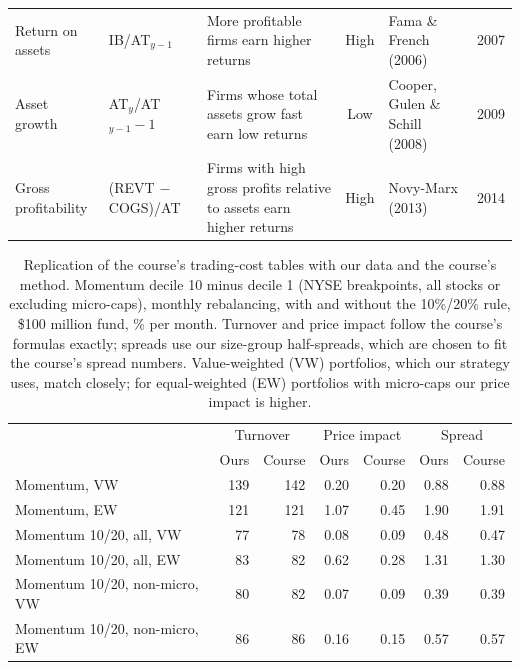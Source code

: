 \documentclass[12pt,a4paper]{article}
\begin{document}
\begin{singlespace}
\begin{table}[!htbp]
\begin{tabular}{L{2.2cm}L{3.9cm}L{4.4cm}cL{2.4cm}c}
Return on assets & IB/AT$_{y-1}$ & More profitable firms earn higher returns & High & Fama \& French (2006) & 2007\\
Asset growth & AT$_y$/AT$_{y-1}-1$ & Firms whose total assets grow fast earn low returns & Low & Cooper, Gulen \& Schill (2008) & 2009\\
Gross profitability & (REVT $-$ COGS)/AT & Firms with high gross profits relative to assets earn higher returns & High & Novy-Marx (2013) & 2014\\
\bottomrule\end{tabular}
\end{table}

\begin{table}[!htbp]\centering
\caption{Replication of the course's trading-cost tables with our data and the course's method. Momentum decile 10 minus decile 1 (NYSE breakpoints, all stocks or excluding micro-caps), monthly rebalancing, with and without the 10\%/20\% rule, \$100 million fund, \% per month. Turnover and price impact follow the course's formulas exactly; spreads use our size-group half-spreads, which are chosen to fit the course's spread numbers. Value-weighted (VW) portfolios, which our strategy uses, match closely; for equal-weighted (EW) portfolios with micro-caps our price impact is higher.}\label{tab:replication}
\footnotesize
\begin{tabular}{lrrrrrr}\toprule
 & \multicolumn{2}{c}{Turnover} & \multicolumn{2}{c}{Price impact} & \multicolumn{2}{c}{Spread}\\
 & Ours & Course & Ours & Course & Ours & Course\\\midrule
Momentum, VW & 139 & 142 & 0.20 & 0.20 & 0.88 & 0.88\\
Momentum, EW & 121 & 121 & 1.07 & 0.45 & 1.90 & 1.91\\
Momentum 10/20, all, VW & 77 & 78 & 0.08 & 0.09 & 0.48 & 0.47\\
Momentum 10/20, all, EW & 83 & 82 & 0.62 & 0.28 & 1.31 & 1.30\\
Momentum 10/20, non-micro, VW & 80 & 82 & 0.07 & 0.09 & 0.39 & 0.39\\
Momentum 10/20, non-micro, EW & 86 & 86 & 0.16 & 0.15 & 0.57 & 0.57\\
\bottomrule\end{tabular}
\end{table}


\end{singlespace}
\end{document}
